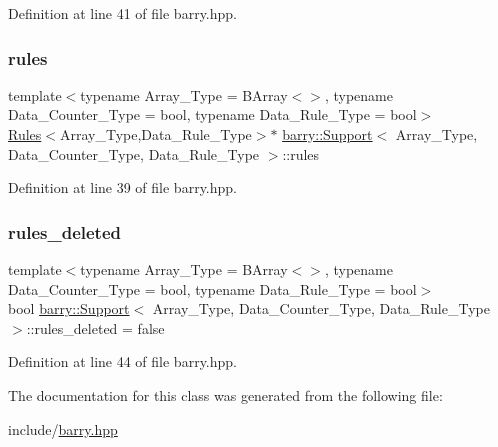 Definition at line 41 of file barry.\+hpp.

\mbox{\label{classbarry_1_1_support_a9311c3288f59feaece0680f9a7b630dd}} 
\subsubsection{\texorpdfstring{rules}{rules}}
{\footnotesize\ttfamily template$<$typename Array\+\_\+\+Type = B\+Array$<$$>$, typename Data\+\_\+\+Counter\+\_\+\+Type = bool, typename Data\+\_\+\+Rule\+\_\+\+Type = bool$>$ \\
\hyperlink{classbarry_1_1_rules}{Rules}$<$Array\+\_\+\+Type,Data\+\_\+\+Rule\+\_\+\+Type$>$$\ast$ \hyperlink{classbarry_1_1_support}{barry\+::\+Support}$<$ Array\+\_\+\+Type, Data\+\_\+\+Counter\+\_\+\+Type, Data\+\_\+\+Rule\+\_\+\+Type $>$\+::rules}



Definition at line 39 of file barry.\+hpp.

\mbox{\label{classbarry_1_1_support_ab06f3a207f1d647d327a815bcedba9dd}} 
\subsubsection{\texorpdfstring{rules\+\_\+deleted}{rules\_deleted}}
{\footnotesize\ttfamily template$<$typename Array\+\_\+\+Type = B\+Array$<$$>$, typename Data\+\_\+\+Counter\+\_\+\+Type = bool, typename Data\+\_\+\+Rule\+\_\+\+Type = bool$>$ \\
bool \hyperlink{classbarry_1_1_support}{barry\+::\+Support}$<$ Array\+\_\+\+Type, Data\+\_\+\+Counter\+\_\+\+Type, Data\+\_\+\+Rule\+\_\+\+Type $>$\+::rules\+\_\+deleted = false}



Definition at line 44 of file barry.\+hpp.



The documentation for this class was generated from the following file\+:\begin{DoxyCompactItemize}
\item 
include/\hyperlink{barry_8hpp}{barry.\+hpp}\end{DoxyCompactItemize}
